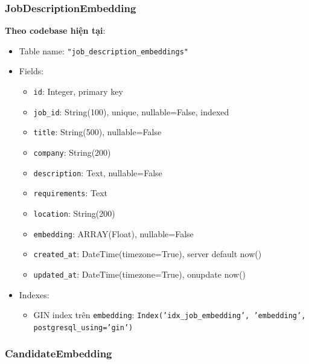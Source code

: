 \subsubsection{JobDescriptionEmbedding}

\textbf{Theo codebase hiện tại}:
\begin{itemize}
    \item Table name: \texttt{"job\_description\_embeddings"}
    \item Fields:
    \begin{itemize}
        \item \texttt{id}: Integer, primary key
        \item \texttt{job\_id}: String(100), unique, nullable=False, indexed
        \item \texttt{title}: String(500), nullable=False
        \item \texttt{company}: String(200)
        \item \texttt{description}: Text, nullable=False
        \item \texttt{requirements}: Text
        \item \texttt{location}: String(200)
        \item \texttt{embedding}: ARRAY(Float), nullable=False
        \item \texttt{created\_at}: DateTime(timezone=True), server default now()
        \item \texttt{updated\_at}: DateTime(timezone=True), onupdate now()
    \end{itemize}
    \item Indexes:
    \begin{itemize}
        \item GIN index trên \texttt{embedding}: \texttt{Index('idx\_job\_embedding', 'embedding', postgresql\_using='gin')}
    \end{itemize}
\end{itemize}

\subsubsection{CandidateEmbedding}

